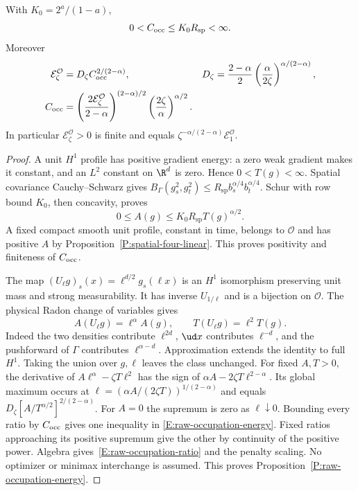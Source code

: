 \begin{proposition}
  \label{P:raw-occupation-energy}
  With $K_0=2^a/(1-a)$,
  \[
    0<C_{\rm occ}\le K_0R_{\mathrm{sp}}<\infty .
  \]
  Moreover
  \begin{align}
    \mathcal E_\zeta^{\mathcal O}
    &=D_\zeta C_{\rm occ}^{2/(2-\alpha)},&
    D_\zeta&=\frac{2-\alpha}{2}
    \left(\frac{\alpha}{2\zeta}\right)^{\alpha/(2-\alpha)},
    \label{E:raw-occupation-energy}\\
    C_{\rm occ}
    &=\left(\frac{2\mathcal E_\zeta^{\mathcal O}}{2-\alpha}\right)^{(2-\alpha)/2}
    \left(\frac{2\zeta}{\alpha}\right)^{\alpha/2}.
    \label{E:raw-occupation-ratio}
  \end{align}
  In particular $\mathcal E_\zeta^{\mathcal O}>0$ is finite and
  equals $\zeta^{-\alpha/(2-\alpha)}\mathcal E_1^{\mathcal O}$.
\end{proposition}

\begin{proof}
  A unit $H^1$ profile has positive gradient energy:
  a zero weak gradient makes it constant, and an $L^2$ constant
  on $\R^d$ is zero. Hence $0<T(g)<\infty$.
  Spatial covariance Cauchy--Schwarz gives
  $B_\Gamma(g_s^2,g_t^2)\le
  R_{\mathrm{sp}}b_s^{\alpha/4}b_t^{\alpha/4}$.
  Schur with row bound $K_0$, then concavity, proves
  \begin{equation}\label{E:raw-occupation-bound}
    0\le A(g)\le K_0R_{\mathrm{sp}}T(g)^{\alpha/2}.
  \end{equation}
  A fixed compact smooth unit profile, constant in time, belongs to
  $\mathcal O$ and has positive $A$ by
  Proposition~\ref{P:spatial-four-linear}. This proves positivity
  and finiteness of $C_{\rm occ}$.

  The map $(U_\ell g)_s(x)=\ell^{d/2}g_s(\ell x)$ is an $H^1$
  isomorphism preserving unit mass and strong measurability.
  It has inverse $U_{1/\ell}$ and is a bijection on $\mathcal O$.
  The physical Radon change of variables gives
  \[
    A(U_\ell g)=\ell^\alpha A(g),\qquad
    T(U_\ell g)=\ell^2T(g).
  \]
  Indeed the two densities contribute $\ell^{2d}$, $\ud x$ contributes
  $\ell^{-d}$, and the pushforward of $\Gamma$ contributes
  $\ell^{\alpha-d}$. Approximation extends the identity to full $H^1$.
  Taking the union over $g,\ell$ leaves the class unchanged.
  For fixed $A,T>0$, the derivative of
  $A\ell^\alpha-\zeta T\ell^2$ has the sign of
  $\alpha A-2\zeta T\ell^{2-\alpha}$.
  Its global maximum occurs at
  $\ell=(\alpha A/(2\zeta T))^{1/(2-\alpha)}$ and equals
  $D_\zeta[A/T^{\alpha/2}]^{2/(2-\alpha)}$.
  For $A=0$ the supremum is zero as $\ell\downarrow0$.
  Bounding every ratio by $C_{\rm occ}$ gives one inequality in
  \eqref{E:raw-occupation-energy}.
  Fixed ratios approaching its positive supremum give the other
  by continuity of the positive power.
  Algebra gives~\eqref{E:raw-occupation-ratio} and the penalty scaling.
  No optimizer or minimax interchange is assumed.
  This proves Proposition~\ref{P:raw-occupation-energy}.
\end{proof}

